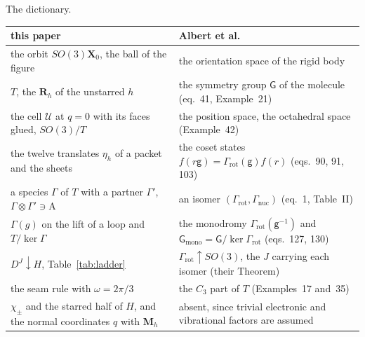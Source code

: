 \documentclass[11pt]{article}
\newenvironment{plaintable}{\par\medskip\noindent\begin{minipage}{\linewidth}\captionsetup{type=table,skip=3pt}\small
  \renewcommand{\arraystretch}{1.05}\setlength{\tabcolsep}{5pt}}{\end{minipage}\par\medskip}
\newcommand{\X}{\mathbf{X}}
\newcommand{\Rmat}{\mathbf{R}}
\begin{document}
\begin{plaintable}
\caption{The dictionary.}
\label{tab:dictionary}
\centering
\begin{tabular}{@{}L{.4}L{.6}@{}}
\hline
this paper & Albert et al.~\cite{AlbertEtAlOrientation}\\
\hline
the orbit $SO(3)\X_0$, the ball of the figure & the orientation space of the rigid body\\
$T$, the $\Rmat_h$ of the unstarred $h$ & the symmetry group $\mathsf G$ of the molecule (eq.~41, Example~21)\\
the cell $\mathcal U$ at $q=0$ with its faces glued, $SO(3)/T$ & the position space, the octahedral space (Example~42)\\
the twelve translates $\eta_h$ of a packet and the sheets & the coset states $f(r\mathsf g)=\Gamma_{\mathrm{rot}}(\mathsf g)f(r)$ (eqs.~90, 91, 103)\\
a species $\Gamma$ of $T$ with a partner $\Gamma'$, $\Gamma\otimes\Gamma'\ni\mathrm A$ & an isomer $(\Gamma_{\mathrm{rot}},\Gamma_{\mathrm{nuc}})$ (eq.~1, Table~II)\\
$\Gamma(g)$ on the lift of a loop and $T/\ker\Gamma$ & the monodromy $\Gamma_{\mathrm{rot}}(\mathsf g^{-1})$ and $\mathsf G_{\mathrm{mono}}=\mathsf G/\ker\Gamma_{\mathrm{rot}}$ (eqs.~127, 130)\\
$D^J\downarrow H$, Table~\ref{tab:ladder} & $\Gamma_{\mathrm{rot}}\uparrow SO(3)$, the $J$ carrying each isomer (their Theorem)\\
the seam rule with $\omega=2\pi/3$ & the $C_3$ part of $T$ (Examples~17 and~35)\\
$\chi_\pm$ and the starred half of $H$, and the normal coordinates $q$ with $\mathbf M_h$ & absent, since trivial electronic and vibrational factors are assumed\\
\hline
\end{tabular}
\end{plaintable}

\clearpage
\end{document}
